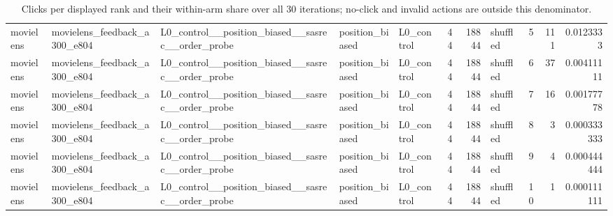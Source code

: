 \begin{table}[htbp!]
\begin{tabular}{lllllrrlrrr}
movielens & movielens\_feedback\_a300\_e804 & L0\_control\_\_position\_biased\_\_sasrec\_\_order\_probe & position\_biased & L0\_control & 44 & 18844 & shuffled & 5 & 111 & 0.0123333 \\
movielens & movielens\_feedback\_a300\_e804 & L0\_control\_\_position\_biased\_\_sasrec\_\_order\_probe & position\_biased & L0\_control & 44 & 18844 & shuffled & 6 & 37 & 0.00411111 \\
movielens & movielens\_feedback\_a300\_e804 & L0\_control\_\_position\_biased\_\_sasrec\_\_order\_probe & position\_biased & L0\_control & 44 & 18844 & shuffled & 7 & 16 & 0.00177778 \\
movielens & movielens\_feedback\_a300\_e804 & L0\_control\_\_position\_biased\_\_sasrec\_\_order\_probe & position\_biased & L0\_control & 44 & 18844 & shuffled & 8 & 3 & 0.000333333 \\
movielens & movielens\_feedback\_a300\_e804 & L0\_control\_\_position\_biased\_\_sasrec\_\_order\_probe & position\_biased & L0\_control & 44 & 18844 & shuffled & 9 & 4 & 0.000444444 \\
movielens & movielens\_feedback\_a300\_e804 & L0\_control\_\_position\_biased\_\_sasrec\_\_order\_probe & position\_biased & L0\_control & 44 & 18844 & shuffled & 10 & 1 & 0.000111111 \\
\hline
\end{tabular}
\caption{Clicks per displayed rank and their within-arm share over all 30 iterations; no-click and invalid actions are outside this denominator.}
\label{chap:results:tab:rq2_rank_counts_l0}
\end{table}
